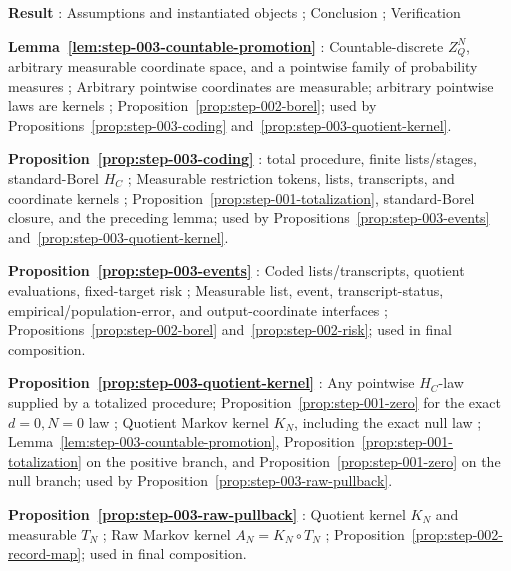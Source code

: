 \noindent\textbf{ Result }:  Assumptions and instantiated objects ;  Conclusion ;  Verification \par
\noindent\textbf{ Lemma~\ref{lem:step-003-countable-promotion} }:  Countable-discrete \(Z_Q^N\), arbitrary measurable coordinate space, and a pointwise family of probability measures ;  Arbitrary pointwise coordinates are measurable; arbitrary pointwise laws are kernels ;  Proposition~\ref{prop:step-002-borel}; used by Propositions~\ref{prop:step-003-coding} and~\ref{prop:step-003-quotient-kernel}. \par
\noindent\textbf{ Proposition~\ref{prop:step-003-coding} }:   total procedure, finite lists/stages, standard-Borel \(H_C\) ;  Measurable restriction tokens, lists, transcripts, and coordinate kernels ;  Proposition~\ref{prop:step-001-totalization}, standard-Borel closure, and the preceding lemma; used by Propositions~\ref{prop:step-003-events} and~\ref{prop:step-003-quotient-kernel}. \par
\noindent\textbf{ Proposition~\ref{prop:step-003-events} }:  Coded lists/transcripts, quotient evaluations, fixed-target risk ;  Measurable list, event, transcript-status, empirical/population-error, and output-coordinate interfaces ;   Propositions~\ref{prop:step-002-borel} and~\ref{prop:step-002-risk}; used in final composition. \par
\noindent\textbf{ Proposition~\ref{prop:step-003-quotient-kernel} }:  Any pointwise \(H_C\)-law supplied by a totalized procedure; Proposition~\ref{prop:step-001-zero} for the exact \(d=0,N=0\) law ;  Quotient Markov kernel \(K_N\), including the exact null law ;  Lemma~\ref{lem:step-003-countable-promotion}, Proposition~\ref{prop:step-001-totalization} on the positive branch, and Proposition~\ref{prop:step-001-zero} on the null branch; used by Proposition~\ref{prop:step-003-raw-pullback}. \par
\noindent\textbf{ Proposition~\ref{prop:step-003-raw-pullback} }:  Quotient kernel \(K_N\) and measurable \(T_N\) ;  Raw Markov kernel \(A_N=K_N\circ T_N\) ;  Proposition~\ref{prop:step-002-record-map}; used in final composition. \par



